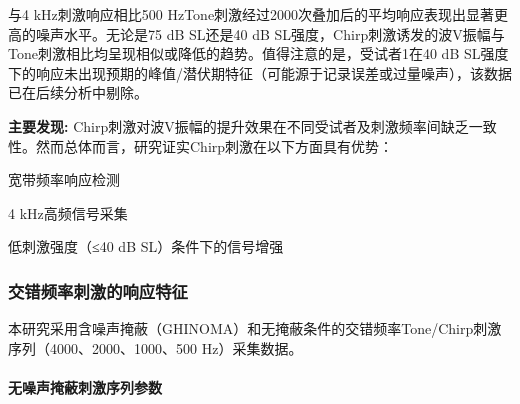 与4 kHz刺激响应相比500 HzTone刺激经过2000次叠加后的平均响应表现出显著更高的噪声水平。无论是75 dB SL还是40 dB SL强度，Chirp刺激诱发的波V振幅与Tone刺激相比均呈现相似或降低的趋势。值得注意的是，受试者1在40 dB SL强度下的响应未出现预期的峰值/潜伏期特征（可能源于记录误差或过量噪声），该数据已在后续分析中剔除。

\textbf{主要发现:}
Chirp刺激对波V振幅的提升效果在不同受试者及刺激频率间缺乏一致性。然而总体而言，研究证实Chirp刺激在以下方面具有优势：

宽带频率响应检测

4 kHz高频信号采集

低刺激强度（≤40 dB SL）条件下的信号增强

\subsubsection{交错频率刺激的响应特征}
本研究采用含噪声掩蔽（GHINOMA）和无掩蔽条件的交错频率Tone/Chirp刺激序列（4000、2000、1000、500 Hz）采集数据。
\paragraph*{无噪声掩蔽刺激序列参数}

